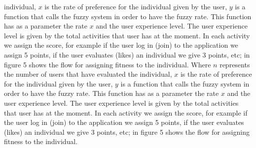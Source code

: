 individual, $x$ is the rate of preference for the  individual  given by the user,
$y$ is a function that calls the fuzzy system in order to have the fuzzy rate.
This function has as a parameter the rate $x$ and the user experience level.
The user experience level
is given  by the  total activities that user has at the moment. In each
activity we assign the score, for example if the user log in (join) to the
application we assign 5 points, if the user evaluates (likes) an individual we
give 3 points, etc; in figure 5 shows the flow for assigning fitness to
the individual. Where $n$ represents  the number of  users that have evaluated the
individual, $x$ is the rate of preference for the  individual  given by the user,
$y$ is a function that calls the fuzzy system in order to have the fuzzy rate.
This function has as a parameter the rate $x$ and the user experience level.
The user experience level
is given  by the  total activities that user has at the moment. In each
activity we assign the score, for example if the user log in (join) to the
application we assign 5 points, if the user evaluates (likes) an individual we
give 3 points, etc; in figure 5 shows the flow for assigning fitness to
the individual.
